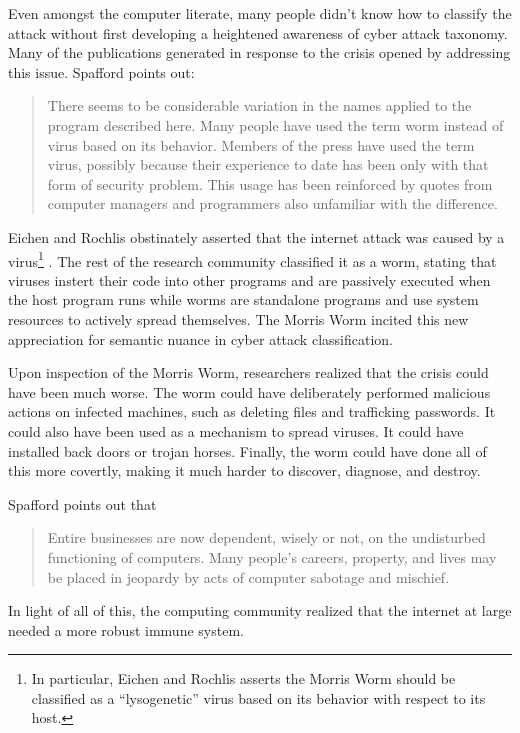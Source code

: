 Even amongst the computer literate, many people didn't know how to classify
the attack without first developing a heightened awareness of cyber attack
taxonomy. Many of the publications generated in response to the crisis opened 
by addressing this issue. Spafford\cite{spafford_internet_1989-1} points out:
\begin{quote}
There seems to be considerable variation in the names applied to the program
described here. Many people have used the term worm instead of virus based on its
behavior. Members of the press have used the term virus, possibly because their 
experience  to date has been only with that form of security problem. This usage
has been reinforced by quotes from computer managers and programmers also
unfamiliar with the difference.
\end{quote}
Eichen and Rochlis\cite{eichin_microscope_1989} obstinately asserted that the
internet attack was caused by a virus\footnote{In particular,
Eichen and Rochlis\cite{eichin_microscope_1989} asserts the Morris Worm should
be classified as a ``lysogenetic'' virus based on its behavior with respect to
its host.} . The rest of the research community classified it as a worm,
stating that viruses instert their code into other programs and are passively
executed when the host program runs while worms are standalone programs and use
system resources to actively spread
themselves\cite{seeley_tour_1989}\cite{spafford_internet_1989}\cite{spafford_internet_1989-1}.
The Morris Worm incited this new appreciation for semantic nuance in cyber attack classification.

Upon inspection of the Morris Worm, researchers realized that the crisis could 
have been much worse. The worm could have deliberately performed malicious
actions on infected machines, such as deleting files and trafficking passwords.
It could also have been used as a mechanism to spread viruses. It could have
installed back doors or trojan horses. Finally, the worm could have done all of
this more covertly, making it much harder to discover, diagnose, and destroy.

Spafford\cite{spafford_crisis_1989} points out that
\begin{quote}
Entire businesses are now dependent, wisely or not, on the undisturbed
functioning of computers. Many people's careers, property, and lives may be
placed in jeopardy by acts of computer sabotage and mischief.
\end{quote} 

In light of all of this, the computing community realized that the internet at
large needed a more robust immune system.
           	
